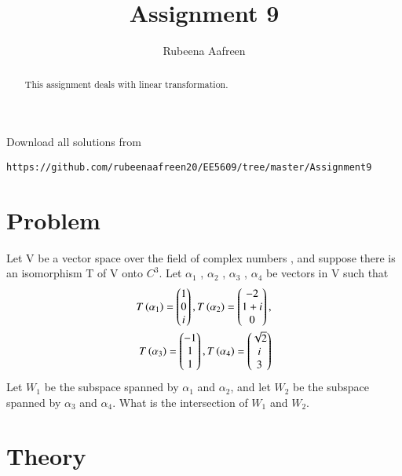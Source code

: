 \documentclass[journal,12pt,twocolumn]{IEEEtran}
\begin{document}
\renewcommand{\thefigure}{\theproblem}
\def\putbox#1#2#3{\makebox[0in][l]{\makebox[#1][l]{}\raisebox{\baselineskip}[0in][0in]{\raisebox{#2}[0in][0in]{#3}}}}
     \def\rightbox#1{\makebox[0in][r]{#1}}
     \def\centbox#1{\makebox[0in]{#1}}
     \def\topbox#1{\raisebox{-\baselineskip}[0in][0in]{#1}}
     \def\midbox#1{\raisebox{-0.5\baselineskip}[0in][0in]{#1}}
\vspace{3cm}
\title{Assignment 9}
\author{Rubeena Aafreen}
\maketitle
\newpage
\bigskip
\renewcommand{\thefigure}{\theenumi}
\renewcommand{\thetable}{\theenumi}
\begin{abstract}
This assignment deals with linear transformation.
\end{abstract}
Download  all solutions from 
\begin{lstlisting}
https://github.com/rubeenaafreen20/EE5609/tree/master/Assignment9
\end{lstlisting}
\section{Problem}
Let V be a vector space over the field of complex numbers , and suppose there is an isomorphism T of V onto $C^{3}$. Let $\alpha_1$ , $\alpha_2$ , $\alpha_3$  , $\alpha_4$ be vectors in V such that 
   \begin{multline}
    \begin{aligned}
    T\left(\alpha_1\right)=\begin{pmatrix}1\\0\\i\end{pmatrix} , T\left(\alpha_2\right)=\begin{pmatrix}-2\\1+i\\0\end{pmatrix} ,\\ T\left(\alpha_3\right)=\begin{pmatrix}-1\\1\\1\end{pmatrix} , T\left(\alpha_4\right)=\begin{pmatrix}\sqrt{2}\\i\\3\end{pmatrix}
    \end{aligned}
    \end{multline}
    Let $W_1$ be the subspace spanned by $\alpha_1$ and $\alpha_2$, and let $W_2$ be the subspace spanned by $\alpha_3$ and $\alpha_4$. What is the intersection of $W_1$ and $W_2$.
\section{Theory}
\end{document}
